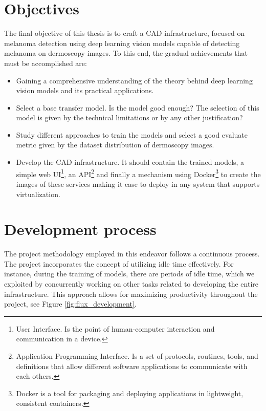 \newpage

\section{Objectives}

The final objective of this thesis is to craft a CAD infrastructure, focused on
melanoma detection using deep learning vision models capable of detecting
melanoma on dermoscopy images. To this end, the gradual achievements that must
be accomplished are:

\begin{itemize}

  \item Gaining a comprehensive understanding of the theory behind deep
    learning vision models and its practical applications.

   \item Select a base transfer model. Is the model good enough? The selection
     of this model is given by the technical limitations or by any other
     justification?

  \item Study different approaches to train the models and select a good
    evaluate metric given by the dataset distribution of dermoscopy images.

  \item  Develop the CAD infrastructure. It should contain the  trained models,
    a simple web UI\footnote{User Interface. Is the point of human-computer
    interaction and communication in a device.}, an API\footnote{Application
      Programming Interface. Is a set of protocols, routines, tools, and
    definitions that allow different software applications to communicate with
  each others.} and finally a mechanism using Docker\footnote{Docker is a tool
  for packaging and deploying applications in lightweight, consistent
containers.} to create the images of these services making it ease to deploy in
any system that supports virtualization.

\end{itemize}


\section{Development process}

The project methodology employed in this endeavor follows a continuous process.
The project incorporates the concept of utilizing idle time effectively. For
instance, during the training of models, there are periods of idle time, which
we exploited by concurrently working on other tasks related to developing the
entire infrastructure. This approach allows for maximizing productivity
throughout the project, see Figure \ref{fig:flux_development}.

